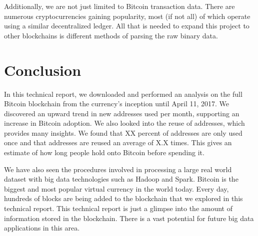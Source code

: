 \documentclass[9pt,twocolumn,twoside]{idsi}
\begin{document}
Additionally, we are not just limited to Bitcoin transaction data. There are numerous cryptocurrencies gaining popularity, most (if not all) of which operate using a similar decentralized ledger. All that is needed to expand this project to other blockchains is different methods of parsing the raw binary data.

\section{Conclusion}
In this technical report, we downloaded and performed an analysis on the full Bitcoin blockchain from the currency's inception until April 11, 2017. We discovered an upward trend in new addresses used per month, supporting an increase in Bitcoin adoption. We also looked into the reuse of addresses, which provides many insights. We found that XX percent of addresses are only used once and that addresses are reused an average of X.X times. This gives an estimate of how long people hold onto Bitcoin before spending it.

We have also seen the procedures involved in processing a large real world dataset with big data technologies such as Hadoop and Spark. Bitcoin is the biggest and most popular virtual currency in the world today. Every day, hundreds of blocks are being added to the blockchain that we explored in this technical report. This technical report is just a glimpse into the amount of information stored in the blockchain. There is a vast potential for future big data applications in this area.
\end{document}
